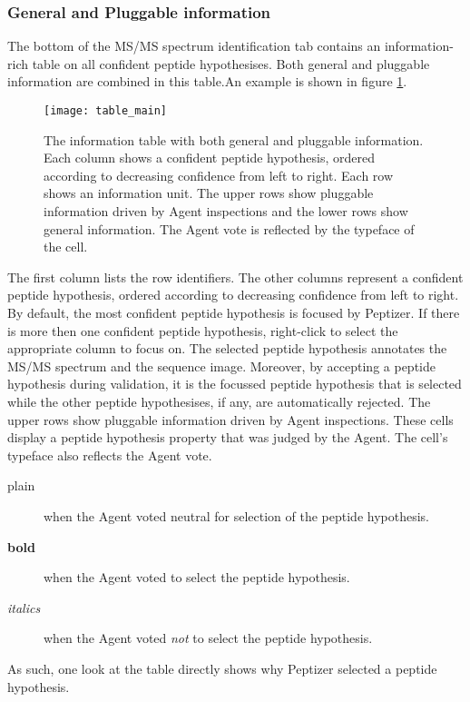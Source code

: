 \subsubsection{\label{information_table}General and Pluggable information}
\npar The bottom of the MS/MS spectrum identification tab contains an information-rich table on all confident peptide hypothesises. Both general and pluggable information are combined in this table.\npar An example is shown in figure \ref{table_main}.
%
\begin{figure}[h!]
\begin{center}
	\texttt{[image: table\_main]}
	\caption{\label{table_main}The information table with both general and pluggable information. Each column shows a confident peptide hypothesis, ordered according to decreasing confidence from left to right. Each row shows an information unit. The upper rows show pluggable information driven by Agent inspections and the lower rows show general information. The Agent vote is reflected by the typeface of the cell.}
\end{center}
\end{figure}
%
\npar The first column lists the row identifiers. The other columns represent a confident peptide hypothesis, ordered according to decreasing confidence from left to right. By default, the most confident peptide hypothesis is focused by Peptizer. If there is more then one confident peptide hypothesis, right-click to select the appropriate column to focus on. The selected peptide hypothesis annotates the MS/MS spectrum and the sequence image. Moreover, by accepting a peptide hypothesis during validation, it is the focussed peptide hypothesis that is selected while the other peptide hypothesises, if any, are automatically rejected.
\npar The upper rows show pluggable information driven by Agent inspections. These cells display a peptide hypothesis property that was judged by the Agent. The cell's typeface also reflects the Agent vote.
\begin{description}
	\item[plain] when the Agent voted neutral for selection of the peptide hypothesis.
	\item[\textbf{bold}] when the Agent voted to select the peptide hypothesis.
	\item[\textit{italics}] when the Agent voted \textit{not} to select the peptide hypothesis.
\end{description}
%
\npar As such, one look at the table directly shows why Peptizer selected a peptide hypothesis.
